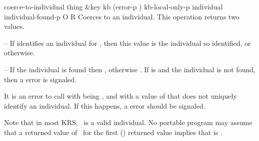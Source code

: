 \begin{okbcop}{coerce-to-individual}{ thing \&key kb (error-p \true) kb-local-only-p} { individual individual-found-p } { O } { R } {  }
Coerces  to an individual.  This operation returns two values.
   \bitem
   \item {} -- If  identifies an individual for
          , then this value is the individual so identified, or
          \false otherwise.
   \item {} -- If the individual is found then \true,
                                   otherwise \false.
   \eitem
   If  is \true and the individual is not found, then a
    error is signaled.

   It is an error to call  with 
   being \true, and with a value of  that does not uniquely
   identify an individual.  If this happens, a  error
   should be signaled.

   Note that in most KRS, \false\ is a valid individual.  No portable
   program may assume that a returned value of \false\ for the first
   () returned value implies that 
   is \false.
\end{okbcop}

